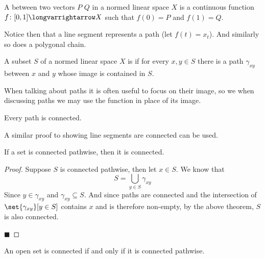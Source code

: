 \documentclass[10pt]{article}
\begin{document}
\begin{defn*}

    A  between two vectors $P$ $Q$ in a normed linear space $X$ is a continuous function
    $f\colon[0,1]\longvarrightarrow X$ such that $f(0)=P$ and $f(1)=Q$.

\end{defn*}

Notice then that a line segment represents a path (let $f(t)=x_t$).
And similarly so does a polygonal chain.

\begin{defn*}

    A subset $S$ of a normed linear space $X$ is  if for every $x,y\in S$ there is a path $\gamma_{xy}$
    between $x$ and $y$ whose image is contained in $S$.

\end{defn*}

When talking about paths it is often useful to focus on their image, so we when discussing paths we may use the function in place of
its image.

\begin{prop*}

    Every path is connected.

\end{prop*}

A similar proof to showing line segments are connected can be used.

\begin{prop*}

    If a set is connected pathwise, then it is connected.

\end{prop*}

\begin{proof}

    Suppose $S$ is connected pathwise, then let $x\in S$.
    We know that
    \[ S = \bigcup_{y\in S}\gamma_{xy} \]
    Since $y\in\gamma_{xy}$ and $\gamma_{xy}\subseteq S$.
    And since paths are connected and the intersection of $\set{\gamma_{xy}}[y\in S]$ contains $x$ and is therefore non-empty, by the above
    theorem, $S$ is also connected.

    \hfill$\blacksquare$

\end{proof}

\begin{thrm*}

    An open set is connected if and only if it is connected pathwise.

\end{thrm*}
\end{document}
